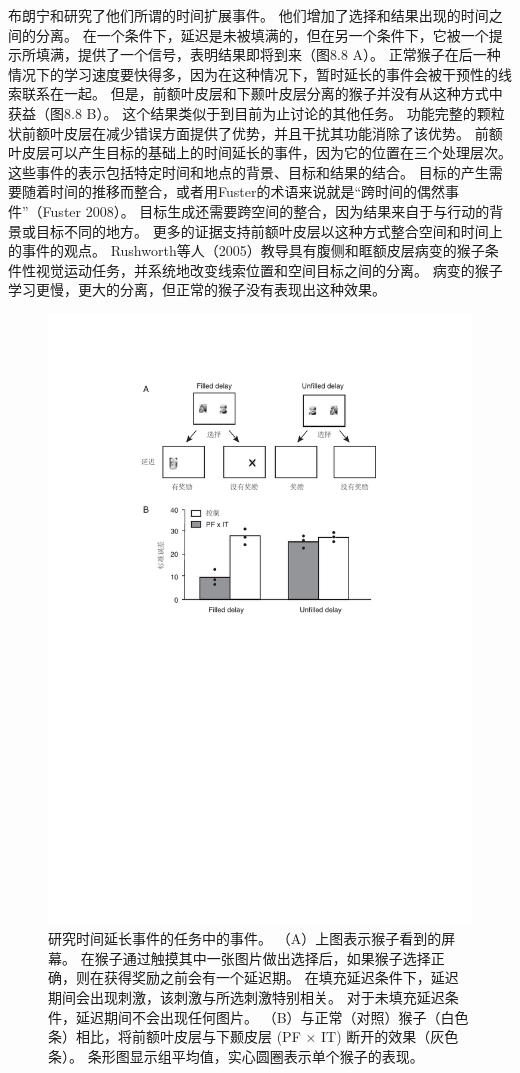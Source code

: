 布朗宁和\cite{browning2008prefrontal}研究了他们所谓的时间扩展事件。
他们增加了选择和结果出现的时间之间的分离。
在一个条件下，延迟是未被填满的，但在另一个条件下，它被一个提示所填满，提供了一个信号，表明结果即将到来（图8.8 A）。
正常猴子在后一种情况下的学习速度要快得多，因为在这种情况下，暂时延长的事件会被干预性的线索联系在一起。
但是，前额叶皮层和下颞叶皮层分离的猴子并没有从这种方式中获益（图8.8 B）。
这个结果类似于到目前为止讨论的其他任务。
功能完整的颗粒状前额叶皮层在减少错误方面提供了优势，并且干扰其功能消除了该优势。
前额叶皮层可以产生目标的基础上的时间延长的事件，因为它的位置在三个处理层次。
这些事件的表示包括特定时间和地点的背景、目标和结果的结合。
目标的产生需要随着时间的推移而整合，或者用Fuster的术语来说就是“跨时间的偶然事件”（Fuster 2008）。
目标生成还需要跨空间的整合，因为结果来自于与行动的背景或目标不同的地方。
更多的证据支持前额叶皮层以这种方式整合空间和时间上的事件的观点。
Rushworth等人（2005）教导具有腹侧和眶额皮层病变的猴子条件性视觉运动任务，并系统地改变线索位置和空间目标之间的分离。
病变的猴子学习更慢，更大的分离，但正常的猴子没有表现出这种效果。


\begin{figure} 
	\centering
	\includegraphics[width=0.7\linewidth]{chap8/fig_8_8}
	\caption{研究时间延长事件的任务中的事件。
		（A）上图表示猴子看到的屏幕。
		在猴子通过触摸其中一张图片做出选择后，如果猴子选择正确，则在获得奖励之前会有一个延迟期。
		在填充延迟条件下，延迟期间会出现刺激，该刺激与所选刺激特别相关。
		对于未填充延迟条件，延迟期间不会出现任何图片。
		（B）与正常（对照）猴子（白色条）相比，将前额叶皮层与下颞皮层 (PF × IT) 断开的效果（灰色条）。
		条形图显示组平均值，实心圆圈表示单个猴子的表现\cite{wilson2010functional}。 \label{fig:8_8}}
\end{figure}



